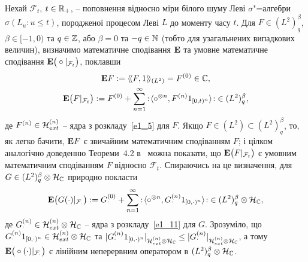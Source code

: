 Нехай $\mathcal F_t$, $t\in\mathbb{R}_+$, -- поповнення відносно міри білого шуму Леві
\mbox{$\sigma$"=алгебри} $\sigma (L_u:u\leq t)$, породженої процесом Леві $L$ до моменту
часу $t$. Для $F\in (L^2)^\beta_q$, $\beta\in [-1,0)$ та $q\in\mathbb{Z}$, або $\beta=0$
та $-q\in\mathbb{N}$ (тобто для узагальнених випадкових величин), визначимо математичне
сподівання $\mathbf{E}$ та умовне математичне сподівання
$\mathbf{E}\big(\circ|_{\mathcal F_t}\big)$, поклавши
\begin{gather*}
\mathbf{E}{F}:=\langle\!\langle F,1\rangle\!\rangle_{(L^2)}=F^{(0)}\in\mathbb{C},\\
\mathbf{E}\big(F|_{\mathcal F_t}\big):=F^{(0)}
+\sum_{n=1}^\infty{:\!\langle}\circ^{\otimes n},F^{(n)}1_{[0,t)^n}{\rangle\!:}
\in (L^2)^\beta_q,
\end{gather*}
де $F^{(n)}\in\mathcal{H}_{ext}^{(n)}$ -- ядра з розкладу~\eqref{e1_5} для $F$.
Якщо $F\in (L^2)\subset (L^2)^\beta_q$, то, як легко бачити, $\mathbf{E}{F}$ є звичайним
математичним сподіванням $F$; і цілком аналогічно доведенню Теореми~4.2 в~\cite{KT09} можна
показати, що $\mathbf{E}\big(F|_{\mathcal F_t}\big)$ є умовним математичним сподіванням $F$
відносно $\mathcal F_t$. Спираючись на це визначення, для
$G\in (L^2)^\beta_q\otimes\mathcal{H}_{\mathbb{C}}$ природно покласти
\begin{equation}\label{e2_1}
\mathbf{E}\big(G(\cdot)|_{\mathcal F_\cdot}\big):=G^{(0)}_\cdot
+\sum_{n=1}^\infty{:\!\langle}\circ^{\otimes n},G^{(n)}_\cdot 1_{[0,\cdot)^n}{\rangle\!:}
\in (L^2)^\beta_q\otimes\mathcal{H}_{\mathbb{C}},
\end{equation}
де $G^{(n)}_\cdot\in\mathcal{H}_{ext}^{(n)}\otimes\mathcal{H}_{\mathbb{C}}$ -- ядра
з розкладу~\eqref{e1_11} для $G$. Зрозуміло, що $G^{(n)}_\cdot 1_{[0,\cdot)^n}
\in\mathcal{H}_{ext}^{(n)}\otimes\mathcal{H}_{\mathbb{C}}$ та
$|G^{(n)}_\cdot 1_{[0,\cdot)^n}|_{\mathcal{H}_{ext}^{(n)}\otimes\mathcal{H}_{\mathbb{C}}}
\leq|G^{(n)}_\cdot|_{\mathcal{H}_{ext}^{(n)}\otimes\mathcal{H}_{\mathbb{C}}}$, а тому
${\mathbf{E}\big(\circ (\cdot)|_{\mathcal F_\cdot}\big)}$ є лінійним неперервним оператором в
$(L^2)^\beta_q\otimes\mathcal{H}_{\mathbb{C}}$.

